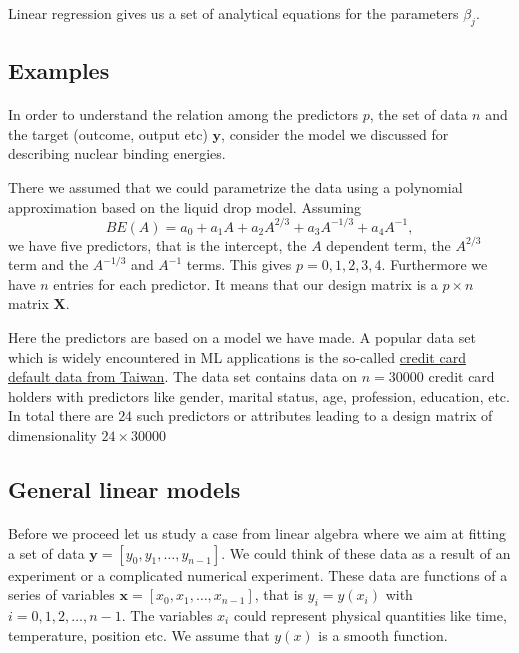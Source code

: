 \documentclass[%
oneside,                 %
final,                   %
10pt]{article}
\begin{document}
Linear regression gives us a set of analytical equations for the parameters $\beta_j$.





\subsection*{Examples}

\paragraph{}
In order to understand the relation among the predictors $p$, the set of data $n$ and the target (outcome, output etc) $\bm{y}$,
consider the model we discussed for describing nuclear binding energies. 

There we assumed that we could parametrize the data using a polynomial approximation based on the liquid drop model.
Assuming 
\[
BE(A) = a_0+a_1A+a_2A^{2/3}+a_3A^{-1/3}+a_4A^{-1},
\]
we have five predictors, that is the intercept, the $A$ dependent term, the $A^{2/3}$ term and the $A^{-1/3}$ and $A^{-1}$ terms.
This gives $p=0,1,2,3,4$. Furthermore we have $n$ entries for each predictor. It means that our design matrix is a 
$p\times n$ matrix $\bm{X}$.

Here the predictors are based on a model we have made. A popular data set which is widely encountered in ML applications is the
so-called \href{{https://www.sciencedirect.com/science/article/pii/S0957417407006719?via%







\subsection*{General linear models}

\paragraph{}
Before we proceed let us study a case from linear algebra where we aim at fitting a set of data $\bm{y}=[y_0,y_1,\dots,y_{n-1}]$. We could think of these data as a result of an experiment or a complicated numerical experiment. These data are functions of a series of variables $\bm{x}=[x_0,x_1,\dots,x_{n-1}]$, that is $y_i = y(x_i)$ with $i=0,1,2,\dots,n-1$. The variables $x_i$ could represent physical quantities like time, temperature, position etc. We assume that $y(x)$ is a smooth function. 
\end{document}

